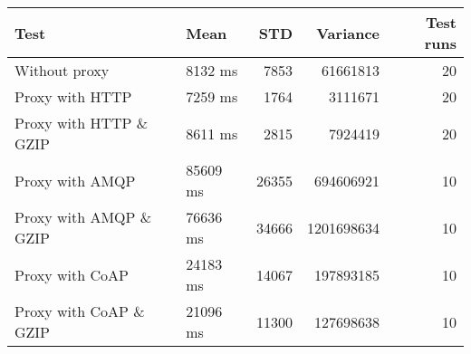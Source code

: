 \begin{tabularx}{\textwidth}{llrrr}
\hline
 Test                   & Mean     &   STD &   Variance &   Test runs \\
\hline
 Without proxy          & 8132 ms  &  7853 &   61661813 &          20 \\
 Proxy with HTTP        & 7259 ms  &  1764 &    3111671 &          20 \\
 Proxy with HTTP \& GZIP & 8611 ms  &  2815 &    7924419 &          20 \\
 Proxy with AMQP        & 85609 ms & 26355 &  694606921 &          10 \\
 Proxy with AMQP \& GZIP & 76636 ms & 34666 & 1201698634 &          10 \\
 Proxy with CoAP        & 24183 ms & 14067 &  197893185 &          10 \\
 Proxy with CoAP \& GZIP & 21096 ms & 11300 &  127698638 &          10 \\
\hline
\end{tabularx}